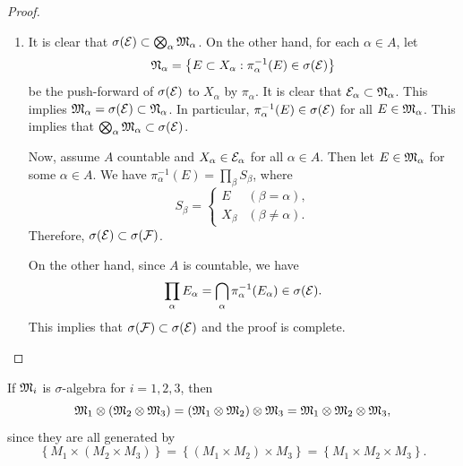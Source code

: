 \documentclass[a4paper]{article}
\begin{document}
{\begin{proof}
\begin{enumerate}
            On the other hand, if $A$ is countable, then
            \[
              \prod_\alpha M_\alpha =
              \bigcap_\alpha \pi_\alpha^{-1} (M_\alpha)
              \in \bigotimes_\alpha \mf_\alpha
            \]
            whenever $M_\alpha \in \mf_\alpha$ for all $\alpha \in A$.
            This implies that $\sigma(\rcal) \subset \bigotimes_\alpha
            \mf_\alpha$.

      \item It is clear that $\sigma(\mathcal{E}) \subset \bigotimes_\alpha
            \mathfrak{M}_\alpha$. On the other hand, for each $\alpha \in A$, let
            \[
              \mathfrak{N}_\alpha = \left\{ E \subset X_\alpha : \pi^{-1}_\alpha
              (E) \in \sigma(\mathcal{E}) \right\}
            \]
            be the push-forward of $\sigma(\mathcal{E})$ to $X_\alpha$ by
            $\pi_\alpha$. It is clear that $\mathcal{E}_\alpha \subset
            \mathfrak{N}_\alpha$. This implies $\mathfrak{M}_\alpha = \sigma(\mathcal{E}) \subset
            \mathfrak{N}_\alpha$. In particular, $\pi_\alpha^{-1}(E) \in
            \sigma(\mathcal{E})$ for all $E \in \mathfrak{M}_\alpha$. This implies that
            $\bigotimes_\alpha \mathfrak{M}_\alpha \subset \sigma(\mathcal{E})$.

            Now, assume $A$ countable and $X_\alpha \in \mathcal{E}_\alpha$ for
            all $\alpha \in A$. Then let $E \in \mathfrak{M}_\alpha$ for some
            $\alpha \in A$. We have $\pi^{-1}_\alpha(E) = \prod_\beta
            S_\beta$, where
            \[
              S_\beta = \begin{cases}
                E       & (\beta = \alpha),    \\
                X_\beta & (\beta \neq \alpha).
              \end{cases}
            \]
            Therefore, $\sigma(\mathcal{E}) \subset \sigma(\mathcal{F})$.

            On the other hand, since $A$ is countable, we have
            \[
              \prod_\alpha E_\alpha = \bigcap_\alpha \pi_\alpha^{-1}
              (E_\alpha) \in \sigma(\mathcal{E}).
            \]
            This implies that $\sigma(\mathcal{F}) \subset \sigma(\mathcal{E})$ and
            the proof is complete.

    \end{enumerate}
  \end{proof}
}

\begin{cor}
  If $\mathfrak{M}_i$ is $\sigma$-algebra for $i = 1, 2, 3$, then
  \[
    \mathfrak{M}_1 \otimes (\mathfrak{M}_2 \otimes \mathfrak{M}_3)
    = (\mathfrak{M}_1 \otimes \mathfrak{M}_2) \otimes \mathfrak{M}_3
    = \mathfrak{M}_1 \otimes \mathfrak{M}_2 \otimes \mathfrak{M}_3,
  \]
  since they are all generated by
  \[
    \left\{ M_1 \times (M_2 \times M_3) \right\}
    = \left\{ (M_1 \times M_2) \times M_3 \right\}
    = \left\{ M_1 \times M_2 \times M_3 \right\}.
  \]
\end{cor}
\end{document}
